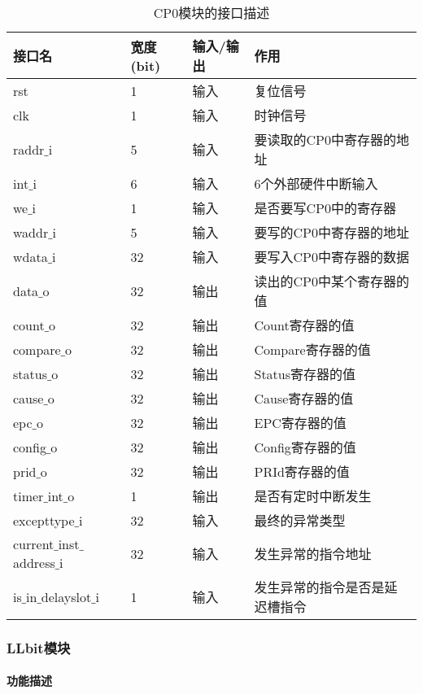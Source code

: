 \quad
\begin{table}[H]
	\centering
	\caption{CP0模块的接口描述}
	\begin{tabular}{|l|l|l|l|}
		\hline
		接口名 & 宽度(bit) & 输入/输出 & 作用 \\
		\hline
		rst & 1 & 输入 & 复位信号 \\
		\hline
		clk & 1 & 输入 & 时钟信号 \\
		\hline
		raddr$\_$i & 5 & 输入 & 要读取的CP0中寄存器的地址 \\
		\hline
		int$\_$i & 6 & 输入 & 6个外部硬件中断输入 \\
		\hline
		we$\_$i & 1 & 输入 & 是否要写CP0中的寄存器 \\
		\hline
		waddr$\_$i & 5 & 输入 & 要写的CP0中寄存器的地址 \\
		\hline
		wdata$\_$i & 32 & 输入 & 要写入CP0中寄存器的数据 \\
		\hline
		data$\_$o & 32 & 输出 & 读出的CP0中某个寄存器的值 \\
		\hline
		count$\_$o & 32 & 输出 & Count寄存器的值 \\
		\hline
		compare$\_$o & 32 & 输出 & Compare寄存器的值 \\
		\hline
		status$\_$o & 32 & 输出 & Status寄存器的值 \\
		\hline
		cause$\_$o & 32 & 输出 & Cause寄存器的值 \\
		\hline
		epc$\_$o & 32 & 输出 & EPC寄存器的值 \\
		\hline
		config$\_$o & 32 & 输出 & Config寄存器的值 \\
		\hline
		prid$\_$o & 32 & 输出 & PRId寄存器的值 \\
		\hline
		timer$\_$int$\_$o & 1 & 输出 & 是否有定时中断发生 \\
		\hline
		excepttype$\_$i & 32 & 输入 & 最终的异常类型 \\
		\hline
		current$\_$inst$\_$address$\_$i & 32 & 输入 & 发生异常的指令地址 \\
		\hline
		is$\_$in$\_$delayslot$\_$i & 1 & 输入 & 发生异常的指令是否是延迟槽指令 \\
		\hline
	\end{tabular}
\end{table}
\subsubsection{LLbit模块}
\paragraph{功能描述}
\quad

